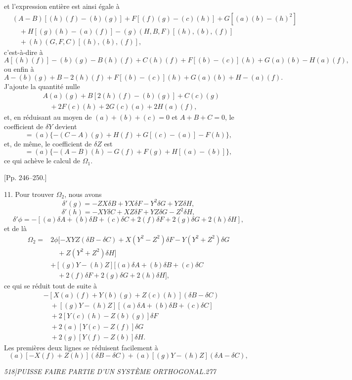 \documentclass[11pt]{article}
\newcommand{\phead}[3]{\noindent\textit{#1\hfill #2\hfill #3}\par\medskip}
\newcommand{\D}{\delta}
\newcommand{\Dp}{\delta'}
\begin{document}
et l'expression enti\`ere est ainsi \'egale \`a
\[
\begin{split}
&(A-B)[(h)(f)-(b)(g)]+F[(f)(g)-(c)(h)]+G[(a)(b)-(h)^2]\\
&\quad+H[(g)(h)-(a)(f)]-(g)(H,B,F)[(h),(b),(f)]\\
&\quad+(h)(G,F,C)[(h),(b),(f)],
\end{split}
\]
c'est-\`a-dire \`a
\[
A[(h)(f)]-(b)(g)-B(h)(f)+C(h)(f)+F[(b)-(c)](h)+G(a)(b)-H(a)(f),
\]
ou enfin \`a
\[
A-(b)(g)+B-2(h)(f)+F[(b)-(c)](h)+G(a)(b)+H-(a)(f).
\]
J'ajoute la quantit\'e nulle
\[
\begin{split}
&A(a)(g)+B[2(h)(f)-(b)(g)]+C(c)(g)\\
&\quad+2F(c)(h)+2G(c)(a)+2H(a)(f),
\end{split}
\]
et, en r\'eduisant au moyen de $(a)+(b)+(c)=0$ et $A+B+C=0$, le coefficient de $\D Y$
devient
\[
=(a)\{-(C-A)(g)+H(f)+G[(c)-(a)]-F(h)\},
\]
et, de m\^eme, le coefficient de $\D Z$ est
\[
=(a)\{-(A-B)(h)-G(f)+F(g)+H[(a)-(b)]\},
\]
ce qui ach\`eve le calcul de $\Omega_1$.

\begin{center}
[Pp. 246--250.]
\end{center}

11. Pour trouver $\Omega_2$, nous avons
\[
\Dp(g)=-ZX\D B+YX\D F-Y^2\D G+YZ\D H,
\]
\[
\Dp(h)=-XY\D C+XZ\D F+YZ\D G-Z^2\D H,
\]
\[
\Dp\phi=-[(a)\D A+(b)\D B+(c)\D C+2(f)\D F+2(g)\D G+2(h)\D H],
\]
et de l\`a
\[
\begin{split}
\Omega_2={}&2\phi[-XYZ(\D B-\D C)+X(Y^2-Z^2)\D F-Y(Y^2+Z^2)\D G\\
&\quad+Z(Y^2+Z^2)\D H]\\
&+[(g)Y-(h)Z][(a)\D A+(b)\D B+(c)\D C\\
&\quad+2(f)\D F+2(g)\D G+2(h)\D H],
\end{split}
\]
ce qui se r\'eduit tout de suite \`a
\[
\begin{split}
&-[X(a)(f)+Y(b)(g)+Z(c)(h)](\D B-\D C)\\
&\quad+[(g)Y-(h)Z][(a)\D A+(b)\D B+(c)\D C]\\
&\quad+2[Y(c)(h)-Z(b)(g)]\D F\\
&\quad+2(a)[Y(c)-Z(f)]\D G\\
&\quad+2(g)[Y(f)-Z(b)]\D H.
\end{split}
\]
Les premi\`eres deux lignes se r\'eduisent facilement \`a
\[
(a)[-X(f)+Z(h)](\D B-\D C)+(a)[(g)Y-(h)Z](\D A-\D C),
\]

\clearpage

\phead{518]}{PUISSE FAIRE PARTIE D'UN SYST\`EME ORTHOGONAL.}{277}
\end{document}
